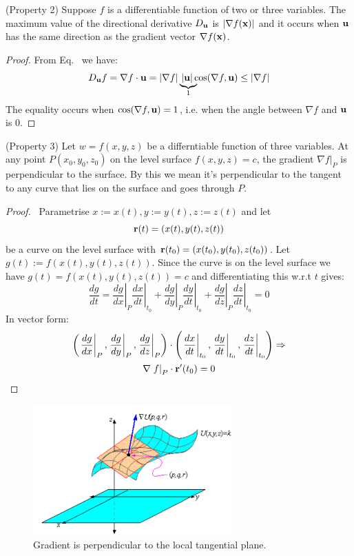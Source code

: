 \documentclass[a4paper]{article}
\numberwithin{equation}{section} %
\newcommand{\myunderbrace}[2]{\mathrlap{\underbrace{\phantom{#1}}_{#2}}
      #1}
\newcommand{\B}[1]{\textbf{\textup{#1}}} %
\renewcommand{\eqref}{Eq.~\originaleqref}
\renewcommand*{\eqref}[1]{Eq.~\originaleqref{#1}}
\begin{document}
\begin{corollary} (Property 2)
Suppose $f$ is a differentiable function of two or three variables. The maximum value of the directional derivative $D_{\B{u}}$ is $\left| \nabla f(\B{x}) \right |$ and it occurs when $\B{u}$ has the same direction as the gradient vector $\nabla f(\B{x})$.
\end{corollary}
\begin{proof}
From \eqref{eq:directional_deriv} we have:
\[
D_{\B{u}}f=\nabla f \cdot \B{u} = \left |\nabla f \right|  \myunderbrace{\left| \B{u} \right|}{1} \cos(\nabla f, \B{u}) \leq \left |\nabla f \right|  
\]
The equality occurs when $\cos(\nabla f, \B{u})=1$, i.e. when the angle between $\nabla f$ and $\B{u}$ is $0$.
\end{proof}
\begin{corollary} (Property 3) 
Let $w=f(x,y,z)$ be a differntiable function of three variables. At any point $P(x_0,y_0,z_0)$ on the level surface $f(x,y,z)=c$, the gradient $\nabla f\left| \right._P$ is perpendicular to the surface. By this we mean it's perpendicular to the tangent to any curve that lies on the surface and goes through $P$.
\end{corollary}
\begin{proof}
\cite{gradient_perp_proof}~Parametrise $x:=x(t),y:=y(t),z:=z(t)$ and let
\[
\B{r}(t)=\left( x(t),y(t),z(t) \right)
\]
be a curve on the level surface with $\B{r}(t_0)=\left( x(t_0),y(t_0),z(t_0) \right)$. Let $g(t):=f\left(x(t),y(t),z(t) \right)$. Since the curve is on the level surface we have $g(t)=f\left(x(t),y(t),z(t) \right)=c$ and differentiating this w.r.t $t$ gives:
\[
\frac{dg}{dt}=\left.\frac{dg}{dx}\right|_P \left.\frac{dx}{dt}\right|_{t_0} + \left.\frac{dg}{dy}\right|_P \left.\frac{dy}{dt}\right|_{t_0} + \left.\frac{dg}{dz}\right|_P \left.\frac{dz}{dt}\right|_{t_0} = 0 
\]
In vector form:
\[
\begin{gathered}
\left(\left.\frac{dg}{dx}\right|_P,\left.\frac{dg}{dy}\right|_P , \left.\frac{dg}{dz}\right|_P \right) \cdot
\left(\left.\frac{dx}{dt}\right|_{t_0} , \left.\frac{dy}{dt}\right|_{t_0} , \left.\frac{dz}{dt}\right|_{t_0}  \right) \Rightarrow\\
\nabla \left. f \right|_P \cdot \B{r}'(t_0)=0
\end{gathered}
\]

\end{proof}

\begin{figure}[H]
	\centering %
	\includegraphics[height=5cm]{gradient_on_surface_2.PNG}
    \caption{Gradient is perpendicular to the local tangential plane.}
    \label{fig:gradient_on_surface}
\end{figure}
\end{document}
